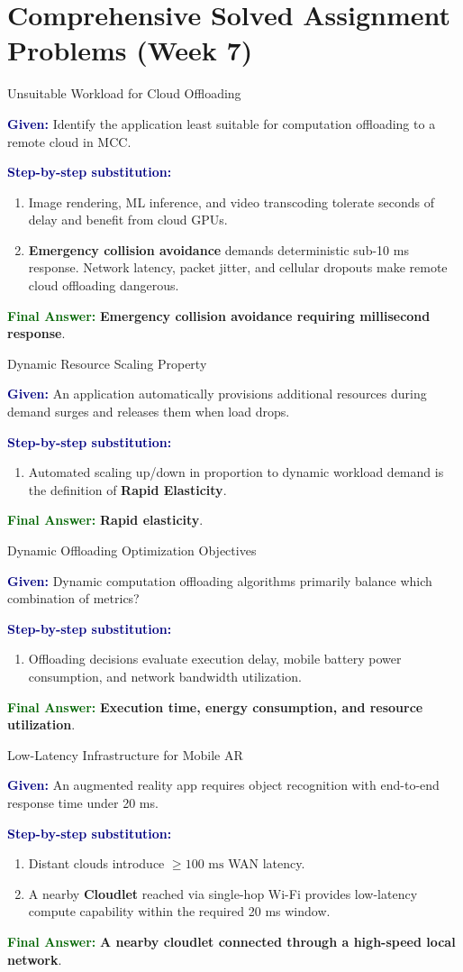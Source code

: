 \documentclass[11pt,a4paper,openany]{report}
\newcommand{\Given}{\par\textbf{\textcolor{navy}{Given:}} }
\newcommand{\Steps}{\par\textbf{\textcolor{navy}{Step-by-step substitution:}}\par}
\newcommand{\Answer}{\par\textbf{\textcolor{darkgreen}{Final Answer:}} }
\begin{document}
\section{Comprehensive Solved Assignment Problems (Week 7)}

\begin{solved}{Unsuitable Workload for Cloud Offloading}
\Given Identify the application least suitable for computation offloading to a remote cloud in MCC.
\Steps
\begin{enumerate}[leftmargin=*]
  \item Image rendering, ML inference, and video transcoding tolerate seconds of delay and benefit from cloud GPUs.
  \item \textbf{Emergency collision avoidance} demands deterministic sub-10 ms response. Network latency, packet jitter, and cellular dropouts make remote cloud offloading dangerous.
\end{enumerate}
\Answer \textbf{Emergency collision avoidance requiring millisecond response}.
\end{solved}

\begin{solved}{Dynamic Resource Scaling Property}
\Given An application automatically provisions additional resources during demand surges and releases them when load drops.
\Steps
\begin{enumerate}[leftmargin=*]
  \item Automated scaling up/down in proportion to dynamic workload demand is the definition of \textbf{Rapid Elasticity}.
\end{enumerate}
\Answer \textbf{Rapid elasticity}.
\end{solved}

\begin{solved}{Dynamic Offloading Optimization Objectives}
\Given Dynamic computation offloading algorithms primarily balance which combination of metrics?
\Steps
\begin{enumerate}[leftmargin=*]
  \item Offloading decisions evaluate execution delay, mobile battery power consumption, and network bandwidth utilization.
\end{enumerate}
\Answer \textbf{Execution time, energy consumption, and resource utilization}.
\end{solved}

\begin{solved}{Low-Latency Infrastructure for Mobile AR}
\Given An augmented reality app requires object recognition with end-to-end response time under 20 ms.
\Steps
\begin{enumerate}[leftmargin=*]
  \item Distant clouds introduce $\ge 100\text{ ms}$ WAN latency.
  \item A nearby \textbf{Cloudlet} reached via single-hop Wi-Fi provides low-latency compute capability within the required 20 ms window.
\end{enumerate}
\Answer \textbf{A nearby cloudlet connected through a high-speed local network}.
\end{solved}
\end{document}
